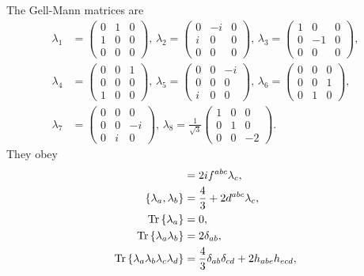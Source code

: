 The Gell-Mann matrices are
%
\begin{align}
    \lambda_1
    & = 
    \begin{pmatrix}
        0 & 1 & 0 \\
        1 & 0 & 0 \\
        0 & 0 & 0
    \end{pmatrix},\,
    \lambda_2
    = 
    \begin{pmatrix}
        0 & -i & 0 \\
        i & 0 & 0 \\
        0 & 0 & 0
    \end{pmatrix},\,
    \lambda_3
    = 
    \begin{pmatrix}
        1 & 0 & 0 \\
        0 & -1 & 0 \\
        0 & 0 & 0
    \end{pmatrix},\\
    \lambda_4
    & = 
    \begin{pmatrix}
        0 & 0 & 1 \\
        0 & 0 & 0 \\
        1 & 0 & 0
    \end{pmatrix},\,
    \lambda_5
    = 
    \begin{pmatrix}
        0 & 0 & -i \\
        0 & 0 & 0 \\
        i & 0 & 0
    \end{pmatrix},\,
    \lambda_6
    = 
    \begin{pmatrix}
        0 & 0 & 0 \\
        0 & 0 & 1 \\
        0 & 1 & 0
    \end{pmatrix},\\
    \lambda_7
    & = 
    \begin{pmatrix}
        0 & 0 & 0 \\
        0 & 0 & -i \\
        0 & i & 0
    \end{pmatrix},\,
    \lambda_8
    =  \frac{1}{\sqrt 3}
    \begin{pmatrix}
        1 & 0 & 0 \\
        0 & 1 & 0 \\
        0 & 0 & -2
    \end{pmatrix}.
\end{align}
%
They obey
%
\begin{align}
    [\lambda_a, \lambda_b] & = 2if^{abc} \lambda_c, \\
    \{\lambda_a, \lambda_b\} & = \frac{4}{3} + 2d^{abc} \lambda_c, \\
    \Tr{\lambda_a} & = 0, \\
    \Tr{\lambda_a \lambda_b} &= 2 \delta_{ab}, \\
    \Tr{\lambda_a \lambda_b \lambda_c \lambda_d} 
    &= \frac{4}{3} \delta_{ab}\delta_{cd} + 2 h_{abe}h_{ecd},
\end{align}
